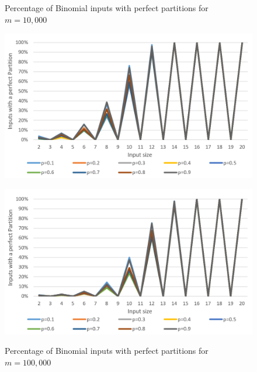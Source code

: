 \begin{figure}[h]
      \centering
      \begin{minipage}[b]{0.45\textwidth}
            \caption{Percentage of Binomial inputs with perfect partitions for $m = 10,000$}
            \includegraphics[width=\textwidth]{figures/images/solvabilityOfInputs/binomial_Input_Solvable_m10000.png}
      \end{minipage}
      \hspace{0.75cm}
      \begin{minipage}[b]{0.45\textwidth}
            \caption{Percentage of Binomial inputs with perfect partitions for $m = 100,000$}
            \includegraphics[width=\textwidth]{figures/images/solvabilityOfInputs/binomial_Input_Solvable_m100000.png}\label{fig:lastBinPercentage}
      \end{minipage}
\end{figure}

